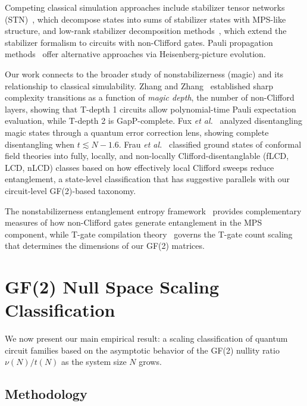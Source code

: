 \documentclass[a4paper,twocolumn,11pt]{quantumarticle}
\begin{document}
Competing classical simulation approaches include stabilizer tensor networks (STN)~\cite{MasotLlima2024}, which decompose states into sums of stabilizer states with MPS-like structure, and low-rank stabilizer decomposition methods~\cite{Bravyi2019,BravyiGosset2016}, which extend the stabilizer formalism to circuits with non-Clifford gates.
Pauli propagation methods~\cite{PauliProp2019} offer alternative approaches via Heisenberg-picture evolution.

Our work connects to the broader study of nonstabilizerness (magic) and its relationship to classical simulability.
Zhang and Zhang~\cite{Zhang2025} established sharp complexity transitions as a function of \emph{magic depth}, the number of non-Clifford layers, showing that T-depth 1 circuits allow polynomial-time Pauli expectation evaluation, while T-depth 2 is GapP-complete.
Fux \emph{et al.}~\cite{Fux2025} analyzed disentangling magic states through a quantum error correction lens, showing complete disentangling when $t \lesssim N - 1.6$.
Frau \emph{et al.}~\cite{Frau2025} classified ground states of conformal field theories into fully, locally, and non-locally Clifford-disentanglable (fLCD, LCD, nLCD) classes based on how effectively local Clifford sweeps reduce entanglement, a state-level classification that has suggestive parallels with our circuit-level GF(2)-based taxonomy.

The nonstabilizerness entanglement entropy framework~\cite{Huang2025,Turkeshi2025} provides complementary measures of how non-Clifford gates generate entanglement in the MPS component, while T-gate compilation theory~\cite{Ross2016,Vandaele2025} governs the T-gate count scaling that determines the dimensions of our GF(2) matrices.

\section{GF(2) Null Space Scaling Classification}
\label{sec:classification}

We now present our main empirical result: a scaling classification of quantum circuit families based on the asymptotic behavior of the GF(2) nullity ratio $\nu(N)/t(N)$ as the system size $N$ grows.

\subsection{Methodology}
\end{document}
